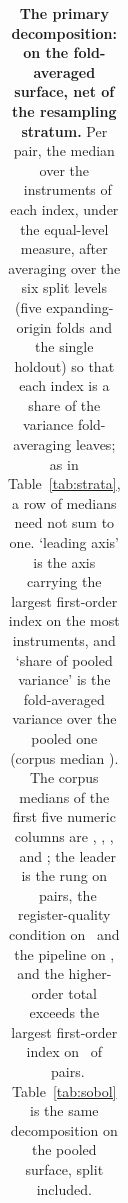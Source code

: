 \begin{table}[t]
{\begin{tabular}{lllllllll}
\bottomrule
\end{tabular}%
}
\caption{\textbf{The primary decomposition: on the fold-averaged surface, net of the resampling stratum.} Per pair, the median over the \nInstruments\ instruments of each index, under the equal-level measure, after averaging over the six split levels (five expanding-origin folds and the single holdout) so that each index is a share of the variance fold-averaging leaves; as in Table~\ref{tab:strata}, a row of medians need not sum to one. `leading axis' is the axis carrying the largest first-order index on the most instruments, and `share of pooled variance' is the fold-averaged variance over the pooled one (corpus median \foldVarRatioPct). The corpus medians of the first five numeric columns are \foldSPipelinePct, \foldSQualityPct, \foldSRungPct, \foldLargestFirstOrderPct\ and \foldInteractionTotalPct; the leader is the rung on \nFoldLeadPairsRung\ pairs, the register-quality condition on \nFoldLeadPairsQuality\ and the pipeline on \nFoldLeadPairsPipeline, and the higher-order total exceeds the largest first-order index on \nFoldInteractionExceeds\ of \nFoldPairs\ pairs. Table~\ref{tab:sobol} is the same decomposition on the pooled surface, split included.}
\label{tab:foldavg}
\end{table}
